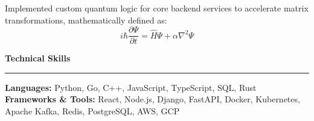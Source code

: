\documentclass[10pt,a4paper]{article}
\begin{document}
Implemented custom quantum logic for core backend services to accelerate matrix transformations, mathematically defined as:
\begin{equation}
i\hbar \frac{\partial \Psi}{\partial t} = \hat{H}\Psi + \alpha \nabla^2 \Psi
\end{equation}

\vspace{4mm}
\noindent\textbf{\large Technical Skills} \\
\rule{\linewidth}{0.5pt}

\textbf{Languages:} Python, Go, C++, JavaScript, TypeScript, SQL, Rust \\
\textbf{Frameworks \& Tools:} React, Node.js, Django, FastAPI, Docker, Kubernetes, Apache Kafka, Redis, PostgreSQL, AWS, GCP
\end{document}
